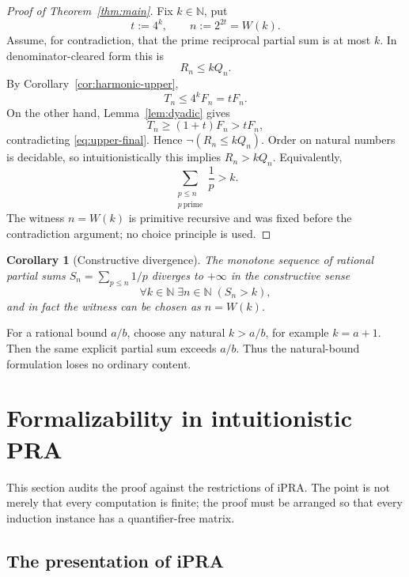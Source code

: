 \documentclass[11pt]{article}
\newtheorem{corollary}[theorem]{Corollary}
\theoremstyle{definition}
\newcommand{\N}{\mathbb{N}}
\newcommand{\ipra}{\mathrm{iPRA}}
\newcommand{\ProdP}{Q}
\newcommand{\NumP}{R}
\newcommand{\Fact}{F}
\newcommand{\NumH}{T}
\newcommand{\Wit}{W}
\begin{document}
\begin{proof}[Proof of Theorem~\ref{thm:main}]
Fix \(k\in\N\), put
\[
  t:=4^k,
  \qquad
  n:=2^{2t}=\Wit(k).
\]
Assume, for contradiction, that the prime reciprocal partial sum is at most
\(k\).  In denominator-cleared form this is
\begin{equation}\label{eq:contra-assumption}
  \NumP_n\leq k\ProdP_n.
\end{equation}
By Corollary~\ref{cor:harmonic-upper},
\begin{equation}\label{eq:upper-final}
  \NumH_n\leq4^k\Fact_n=t\Fact_n.
\end{equation}
On the other hand, Lemma~\ref{lem:dyadic} gives
\begin{equation}\label{eq:lower-final}
  \NumH_n\geq(1+t)\Fact_n>t\Fact_n,
\end{equation}
contradicting \eqref{eq:upper-final}.  Hence
\(
 \neg(\NumP_n\leq k\ProdP_n).
\)
Order on natural numbers is decidable, so intuitionistically this implies
\(
 \NumP_n>k\ProdP_n.
\)
Equivalently,
\[
  \sum_{\substack{p\leq n\\p\ \mathrm{prime}}}\frac1p>k.
\]
The witness \(n=\Wit(k)\) is primitive recursive and was fixed before the
contradiction argument; no choice principle is used.
\end{proof}

\begin{corollary}[Constructive divergence]\label{cor:divergence}
The monotone sequence of rational partial sums
\(
 S_n=\sum_{p\leq n}1/p
\)
diverges to \(+\infty\) in the constructive sense
\[
  \forall k\in\N\;\exists n\in\N\;(S_n>k),
\]
and in fact the witness can be chosen as \(n=\Wit(k)\).
\end{corollary}

For a rational bound \(a/b\), choose any natural \(k>a/b\), for example
\(k=a+1\).  Then the same explicit partial sum exceeds \(a/b\).  Thus the
natural-bound formulation loses no ordinary content.

\section{Formalizability in intuitionistic PRA}

This section audits the proof against the restrictions of \(\ipra\).  The
point is not merely that every computation is finite; the proof must be
arranged so that every induction instance has a quantifier-free matrix.

\subsection{The presentation of iPRA}
\end{document}
